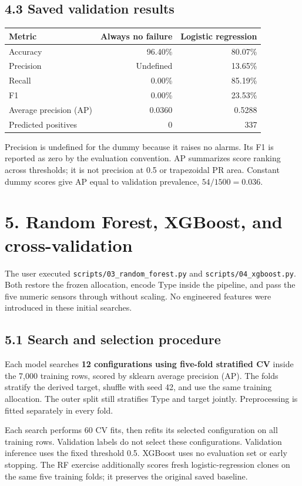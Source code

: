 \documentclass[11pt,a4paper]{article}
\newcommand{\filepath}[1]{\nolinkurl{#1}}
\newcommand{\pagetitle}[1]{\section*{#1}}
\begin{document}
\subsection*{4.3 Saved validation results}
\begin{center}
\begin{tabular}{lrr}
\toprule
Metric & Always no failure & Logistic regression \\
\midrule
Accuracy & 96.40\% & 80.07\% \\
Precision & Undefined & 13.65\% \\
Recall & 0.00\% & 85.19\% \\
F1 & 0.00\% & 23.53\% \\
Average precision (AP) & 0.0360 & 0.5288 \\
Predicted positives & 0 & 337 \\
\bottomrule
\end{tabular}
\end{center}

Precision is undefined for the dummy because it raises no alarms. Its F1 is
reported as zero by the evaluation convention. AP summarizes score ranking
across thresholds; it is not precision at 0.5 or trapezoidal PR area. Constant
dummy scores give AP equal to validation prevalence, \(54/1500=0.036\).


\newpage
\pagetitle{5. Random Forest, XGBoost, and cross-validation}
The user executed \filepath{scripts/03_random_forest.py} and
\filepath{scripts/04_xgboost.py}. Both restore the frozen allocation, encode
Type inside the pipeline, and pass the five numeric sensors through without
scaling. No engineered features were introduced in these initial searches.

\subsection*{5.1 Search and selection procedure}
Each model searches \textbf{12 configurations using five-fold stratified CV}
inside the 7,000 training rows, scored by sklearn average precision (AP).
The folds stratify the derived target, shuffle with seed 42, and use the same
training allocation. The outer split still stratifies Type and target jointly.
Preprocessing is fitted separately in every fold.

Each search performs 60 CV fits, then refits its selected configuration on all
training rows. Validation labels do not select these configurations. Validation
inference uses the fixed threshold 0.5. XGBoost uses no evaluation set or early
stopping. The RF exercise additionally scores fresh logistic-regression clones
on the same five training folds; it preserves the original saved baseline.
\end{document}
